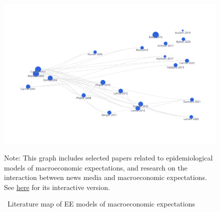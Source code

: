 \begin{figure}[!ht] \centering  %
		\caption{ ~Literature map of EE models of macroeconomic expectations}
	\label{fig:graph_macro}
	\centerline{\includegraphics[width=\textwidth]{./figures/graph_macro}}
				\begin{flushleft}
		{\footnotesize Note: This graph includes selected papers related to epidemiological models of macroeconomic expectations, and research on the interaction between news media and macroeconomic expectations. See \href{https://app.litmaps.co/shared/289F57F4-FDE5-4F94-B1A9-2BA7419DB719}{here} for its interactive version.}
							\end{flushleft}
\end{figure}

\newpage

